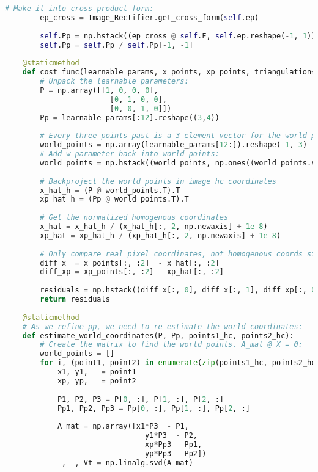 \documentclass{article}
\begin{document}
\begin{lstlisting}[language=Python]
        # Make it into cross product form:
        ep_cross = Image_Rectifier.get_cross_form(self.ep)
        
        self.Pp = np.hstack((ep_cross @ self.F, self.ep.reshape(-1, 1)))
        self.Pp = self.Pp / self.Pp[-1, -1]
    
    @staticmethod
    def cost_func(learnable_params, x_points, xp_points, triangulation=False):
        # Unpack the learnable parameters:
        P = np.array([[1, 0, 0, 0],
                        [0, 1, 0, 0],
                        [0, 0, 1, 0]])
        Pp = learnable_params[:12].reshape((3,4))
        
        # Every three points past is a 3 element vector for the world points;
        world_points = np.array(learnable_params[12:]).reshape(-1, 3)
        # Add w parameter back into world_points:
        world_points = np.hstack((world_points, np.ones((world_points.shape[0], 1))))
        
        # Backproject the world points in image hc coordinates
        x_hat_h = (P @ world_points.T).T
        xp_hat_h = (Pp @ world_points.T).T
        
        # Get the normalized homogenous coordinates
        x_hat = x_hat_h / (x_hat_h[:, 2, np.newaxis] + 1e-8)
        xp_hat = xp_hat_h / (xp_hat_h[:, 2, np.newaxis] + 1e-8)
        
        # Only compare real pixel coordinates, not homogenous coords since we want it to be invariant to a scalar factor of k
        diff_x  = x_points[:, :2]  - x_hat[:, :2]
        diff_xp = xp_points[:, :2] - xp_hat[:, :2]
        
        residuals = np.hstack((diff_x[:, 0], diff_x[:, 1], diff_xp[:, 0], diff_xp[:, 1])).flatten()
        return residuals
    
    @staticmethod
    # As we refine pp, we need to re-estimate the world coordinates:
    def estimate_world_coordinates(P, Pp, points1_hc, points2_hc):
        # Create the matrix to find the world points. A_mat @ X = 0:
        world_points = []
        for i, (point1, point2) in enumerate(zip(points1_hc, points2_hc)):
            x1, y1, _ = point1
            xp, yp, _ = point2
            
            P1, P2, P3 = P[0, :], P[1, :], P[2, :]
            Pp1, Pp2, Pp3 = Pp[0, :], Pp[1, :], Pp[2, :]
            
            A_mat = np.array([x1*P3  - P1,
                                y1*P3  - P2,
                                xp*Pp3 - Pp1,
                                yp*Pp3 - Pp2])
            _, _, Vt = np.linalg.svd(A_mat)
            

\end{lstlisting}
\end{document}
